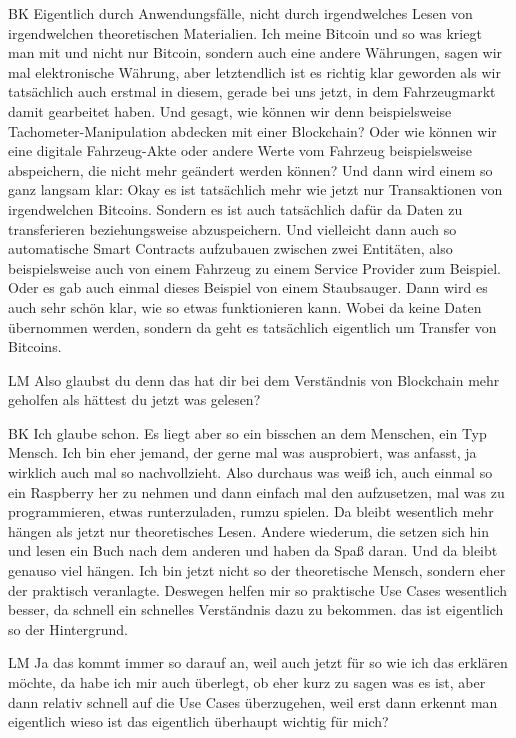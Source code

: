 \begin{xlist}
    \item[BK] Eigentlich durch Anwendungsfälle, nicht durch irgendwelches Lesen von irgendwelchen theoretischen Materialien. Ich meine Bitcoin und so was kriegt man mit und nicht nur Bitcoin, sondern auch eine andere Währungen, sagen wir mal elektronische Währung, aber letztendlich ist es richtig klar geworden als wir tatsächlich auch erstmal in diesem, gerade bei uns jetzt, in dem Fahrzeugmarkt damit gearbeitet haben. Und gesagt, wie können wir denn beispielsweise Tachometer-Manipulation abdecken mit einer Blockchain? Oder wie können wir eine digitale Fahrzeug-Akte oder andere Werte vom Fahrzeug beispielsweise abspeichern, die nicht mehr geändert werden können? Und dann wird einem so ganz langsam klar: Okay es ist tatsächlich mehr wie jetzt nur Transaktionen von irgendwelchen Bitcoins. Sondern es ist auch tatsächlich dafür da Daten zu transferieren beziehungsweise abzuspeichern. Und vielleicht dann auch so automatische Smart Contracts aufzubauen zwischen zwei Entitäten, also beispielsweise auch von einem Fahrzeug zu einem Service Provider zum Beispiel. Oder es gab auch einmal dieses Beispiel von einem Staubsauger. Dann wird es auch sehr schön klar, wie so etwas funktionieren kann. Wobei da keine Daten übernommen werden, sondern da geht es tatsächlich eigentlich um Transfer von Bitcoins.
    \item[LM] Also glaubst du denn das hat dir bei dem Verständnis von Blockchain mehr geholfen als hättest du jetzt was gelesen?
    \item[BK] Ich glaube schon. Es liegt aber so ein bisschen an dem Menschen, ein Typ Mensch. Ich bin eher jemand, der gerne mal was ausprobiert, was anfasst, ja wirklich auch mal so nachvollzieht. Also durchaus was weiß ich, auch einmal so ein Raspberry her zu nehmen und dann einfach mal den aufzusetzen, mal was zu programmieren, etwas runterzuladen, rumzu spielen. Da bleibt wesentlich mehr hängen als jetzt nur theoretisches Lesen. Andere wiederum, die setzen sich hin und lesen ein Buch nach dem anderen und haben da Spaß daran. Und da bleibt genauso viel hängen. Ich bin jetzt nicht so der theoretische Mensch, sondern eher der praktisch veranlagte. Deswegen helfen mir so praktische Use Cases wesentlich besser, da schnell ein schnelles Verständnis dazu zu bekommen. das ist eigentlich so der Hintergrund.
    \item[LM] Ja das kommt immer so darauf an, weil auch jetzt für so wie ich das erklären möchte, da habe ich mir auch überlegt, ob eher kurz zu sagen was es ist, aber dann relativ schnell auf die Use Cases überzugehen, weil erst dann erkennt man eigentlich wieso ist das eigentlich überhaupt wichtig für mich?

\end{xlist}
